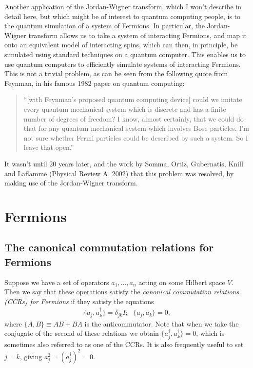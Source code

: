 \documentclass[12pt]{article}
\begin{document}
{Another application of the Jordan-Wigner transform, which I won't
describe in detail here, but which might be of interest to quantum
computing people, is to the quantum simulation of a system of
Fermions.  In particular, the Jordan-Wigner transform allows us to
take a system of interacting Fermions, and map it onto an equivalent
model of interacting spins, which can then, in principle, be simulated
using standard techniques on a quantum computer.  This enables us to
use quantum computers to efficiently simulate systems of interacting
Fermions.  This is not a trivial problem, as can be seen from the
following quote from Feynman, in his famous 1982 paper on quantum
computing:
\begin{quote}
  ``[with Feynman's proposed quantum computing device] could we
  imitate every quantum mechanical system which is discrete and has a
  finite number of degrees of freedom?  I know, almost certainly, that
  we could do that for any quantum mechanical system which involves
  Bose particles.  I'm not sure whether Fermi particles could be
  described by such a system.  So I leave that open.''
\end{quote}
It wasn't until 20 years later, and the work by Somma, Ortiz,
Gubernatis, Knill and Laflamme (Physical Review A, 2002) that this
problem was resolved, by making use of the Jordan-Wigner transform.




\section{Fermions}

\subsection{The canonical commutation relations for Fermions}

Suppose we have a set of operators $a_1,\ldots,a_n$ acting on some
Hilbert space $V$.  Then we say that these operations satisfy the
\emph{canonical commutation relations (CCRs) for Fermions} if they
satisfy the equations
\begin{eqnarray}
  \{ a_j, a_k^\dagger \} = \delta_{jk} I; \,\,\,\, \{ a_j,a_k \} = 0,
\end{eqnarray}
where $\{ A, B \} \equiv AB+BA$ is the anticommutator.  Note that when
we take the conjugate of the second of these relations we obtain $\{
a_j^\dagger, a_k^\dagger \} = 0$, which is sometimes also referred to
as one of the CCRs.  It is also frequently useful to set $j = k$,
giving $a_j^2 = (a_j^\dagger)^2 = 0$.

}
\end{document}
